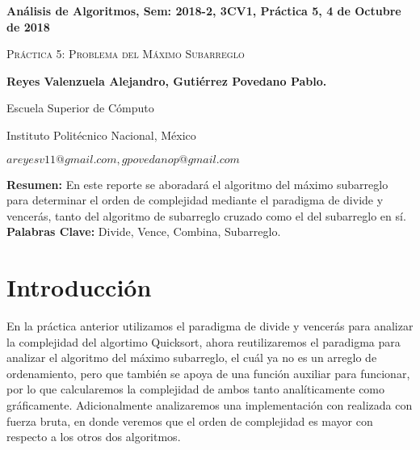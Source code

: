 \documentclass[12pt,twoside]{article}
\date{}
\begin{document}
\centerline{\bf An\'alisis de Algoritmos, Sem: 2018-2, 3CV1, Pr\'actica 5, 4 de Octubre de 2018}
\centerline{}
\centerline{}
\begin{center}
\Large{\textsc{Pr\'actica 5: Problema del M\'aximo Subarreglo}}
\end{center}
\centerline{}
\centerline{\bf {Reyes Valenzuela Alejandro, Guti\'errez Povedano Pablo.}}
\centerline{}
\centerline{Escuela Superior de C\'omputo}
\centerline{Instituto Polit\'ecnico Nacional, M\'exico}
\centerline{$areyesv11@gmail.com, gpovedanop@gmail.com$}
\newtheorem{Theorem}{\quad Theorem}[section]
\newtheorem{Definition}[Theorem]{\quad Definition}
\newtheorem{Corollary}[Theorem]{\quad Corollary}
\newtheorem{Lemma}[Theorem]{\quad Lemma}
\newtheorem{Example}[Theorem]{\quad Example}
\bigskip
\textbf{Resumen:} En este reporte se aboradar\'a el algoritmo del m\'aximo subarreglo para determinar el orden de complejidad mediante el paradigma de divide y vencer\'as, tanto del algoritmo de subarreglo cruzado como el del subarreglo en s\'i.
{\bf Palabras Clave:} Divide, Vence, Combina, Subarreglo.
\section{Introducci\'on}
En la pr\'actica anterior utilizamos el paradigma de divide y vencer\'as para analizar la complejidad del algortimo Quicksort, ahora reutilizaremos el paradigma para analizar el algoritmo del m\'aximo subarreglo, el cu\'al ya no es un arreglo de ordenamiento, pero que tambi\'en se apoya de una funci\'on auxiliar para funcionar, por lo que calcularemos la complejidad de ambos tanto anal\'iticamente como gr\'aficamente. Adicionalmente analizaremos una implementaci\'on con realizada con fuerza bruta, en donde veremos que el orden de complejidad es mayor con respecto a los otros dos algoritmos.\\\\
\end{document}
